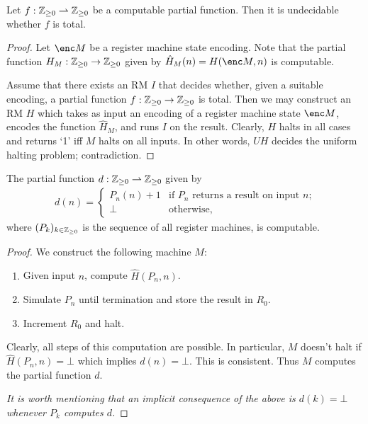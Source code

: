\documentclass{article}
\begin{document}
\begin{claim*}[a, 2]
    Let $f:\mathbb{Z}_{\geq 0}\rightharpoonup\mathbb{Z}_{\geq 0}$ be a computable partial function. Then it is undecidable whether $f$ 
    is total. 
    \begin{proof}
        Let $\enc M$ be a register machine state encoding.  Note that the partial function $H_M:\mathbb{Z}_{\geq 0}\to\mathbb{Z}_{\geq 0}$
        given by $\hat H_M(n)=H(\enc M, n)$ is computable.

        Assume that there exists an RM $I$ that decides whether, given a suitable encoding, a partial
        function $f:\mathbb{Z}_{\geq 0}\to\mathbb{Z}_{\geq 0}$ is total. Then we may construct an RM $H$ which takes as input an encoding 
        of a register machine state $\enc M$, encodes the function $\hat H_M$, and runs $I$ on the result.
        Clearly, $H$ halts in all cases and returns `1' iff $M$ halts on all inputs. In other words,
        $UH$ decides the uniform halting problem; contradiction.
    \end{proof}
\end{claim*}

\begin{claim*}[b]
    The partial function $d:\mathbb{Z}_{\geq 0}\rightharpoonup\mathbb{Z}_{\geq 0}$ given by 
    \begin{align*}
        d(n)=\begin{cases}
            P_n(n)+1 &\text{if $P_n$ returns a result on input $n$;}\\
            \bot &\text{otherwise,}
        \end{cases}
    \end{align*} 
    where $(P_k)_{k\in\mathbb{Z}_{\geq 0}}$ is the sequence of all register machines, is 
    computable.
    \begin{proof}
        We construct the following machine $M$:
        \begin{enumerate}
            \item Given input $n$, compute $\hat H(P_n,n)$.
            \item Simulate $P_n$ until termination and store the result in $R_0$.
            \item Increment $R_0$ and halt.
        \end{enumerate}
        Clearly, all steps of this computation are possible. In particular, $M$ doesn't halt 
        if $\hat H(P_n,n)=\bot$ which implies $d(n)=\bot$. This is consistent. Thus $M$ 
        computes the partial function $d$.
        
        \emph{It is worth mentioning that an implicit consequence of the above is $d(k)=\bot$
        whenever $P_k$ computes $d$.}
    \end{proof}
\end{claim*}
\end{document}
